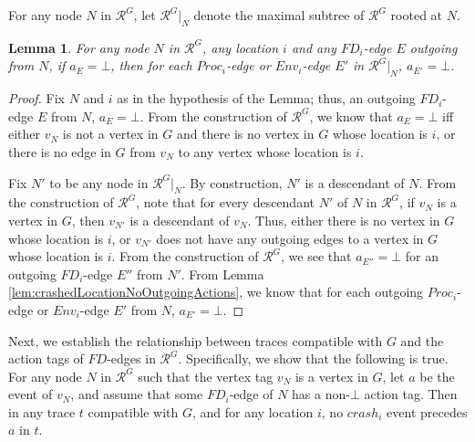 \documentclass[11pt]{article}
\numberwithin{theorem}{section}
\newtheorem{lemma}[theorem]{Lemma}
\begin{document}
For any node $N$ in $\mathcal{R}^G$,  let $\mathcal{R}^G|_N$ denote the maximal subtree of $\mathcal{R}^G$ rooted at $N$.


\begin{lemma}\label{lem:crashedLocationNoActionsInSubtree}
For any node $N$ in $\mathcal{R}^G$, any location $i$ and any $FD_i$-edge $E$ outgoing from $N$, if $a_E = \bot$, then for each $Proc_i$-edge or $Env_i$-edge $E'$ in  $\mathcal{R}^G|_N$,  $a_{E'} = \bot$.
\end{lemma}
\begin{proof}
Fix $N$ and $i$ as in the hypothesis of the Lemma; thus, an outgoing $FD_i$-edge $E$ from $N$, $a_E = \bot$. From the construction of $\mathcal{R}^G$, we know that $a_{E} = \bot$ iff either $v_N$ is not a vertex in $G$ and there is no vertex in $G$ whose location is $i$, or there is no edge in $G$ from $v_{N}$ to any vertex whose location is $i$.

Fix $N'$ to be any node in $\mathcal{R}^G|_N$. By construction, $N'$ is a descendant of $N$. From the construction of $\mathcal{R}^G$, note that for every descendant $N'$ of $N$ in $\mathcal{R}^G$, if $v_{N}$ is a vertex in $G$, then $v_{N'}$ is a descendant of $v_N$. Thus, either there is no vertex in $G$ whose location is $i$, or $v_{N'}$ does not have any outgoing edges to a vertex in $G$ whose location is $i$. From the construction of $\mathcal{R}^G$, we see that  $a_{E''} = \bot$ for an outgoing $FD_i$-edge $E''$ from $N'$. From Lemma \ref{lem:crashedLocationNoOutgoingActions}, we know that  for each outgoing $Proc_i$-edge or $Env_i$-edge $E'$ from $N$, $a_{E'} = \bot$.
\end{proof}


Next, we establish the relationship between traces compatible with $G$ and the action tags of $FD$-edges in $\mathcal{R}^G$. Specifically, we show that
the following is true. 
For any node $N$ in $\mathcal{R}^G$ such that the vertex tag $v_N$ is a vertex in $G$, let $a$ be the event of $v_N$, and assume that some $FD_i$-edge of $N$ has a non-$\bot$ action tag. Then  in any trace $t$ compatible with $G$, and for any location $i$, no $crash_i$ event precedes $a$ in $t$.
\end{document}
